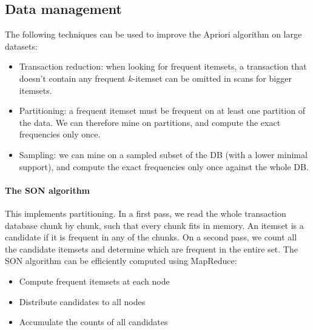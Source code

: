 \subsection{Data management}
The following techniques can be used to improve the Apriori algorithm on large datasets:
\begin{itemize}
\item Transaction reduction: when looking for frequent itemsets, a transaction that doesn't contain any frequent $k$-itemset can be omitted in scans for bigger itemsets.
\item Partitioning: a frequent itemset must be frequent on at least one partition of the data. We can therefore mine on partitions, and compute the exact frequencies only once.
\item Sampling: we can mine on a sampled subset of the DB (with a lower minimal support), and compute the exact frequencies only once against the whole DB.
\end{itemize}

\paragraph{The SON algorithm}
This implements partitioning. In a first pass, we read the whole transaction database chunk by chunk, such that every chunk fits in memory. An itemset is a candidate if it is frequent in any of the chunks.
On a second pass, we count all the candidate itemsets and determine which are frequent in the entire set.
The SON algorithm can be efficiently computed using MapReduce:
\begin{itemize}
\item Compute frequent itemsets at each node
\item Distribute candidates to all nodes
\item Accumulate the counts of all candidates
\end{itemize}
